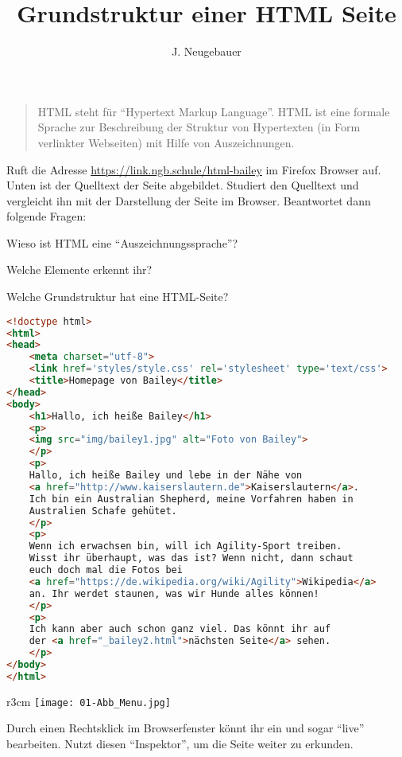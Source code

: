 \documentclass[a4paper,11pt,debug]{scrartcl}
\author{J. Neugebauer}
\title{Grundstruktur einer HTML Seite}
\date{\Heute}
\begin{document}
\ReiheTitel

\begin{quote}
HTML steht für \enquote{Hypertext Markup Language}. HTML ist eine formale Sprache zur Beschreibung der Struktur von Hypertexten (in Form verlinkter Webseiten) mit Hilfe von Auszeichnungen.
\end{quote}

\begin{aufgabe}
Ruft die Adresse \url{https://link.ngb.schule/html-bailey} im Firefox Browser auf. Unten ist der Quelltext der Seite abgebildet. Studiert den Quelltext und vergleicht ihn mit der Darstellung der Seite im Browser. Beantwortet dann folgende Fragen:
\begin{smallenumerate}
	\item  Wieso ist HTML eine \enquote{Auszeichnungssprache}?
	\item Welche Elemente erkennt ihr?
	\item Welche Grundstruktur hat eine HTML-Seite?
\end{smallenumerate}
\begin{lstlisting}[language=HTML,basicstyle=\scriptsize\ttfamily]
<!doctype html>
<html>
<head>
	<meta charset="utf-8">
	<link href='styles/style.css' rel='stylesheet' type='text/css'>
	<title>Homepage von Bailey</title>
</head>
<body>
	<h1>Hallo, ich heiße Bailey</h1>
	<p>
	<img src="img/bailey1.jpg" alt="Foto von Bailey">
	</p>
	<p>
	Hallo, ich heiße Bailey und lebe in der Nähe von 
	<a href="http://www.kaiserslautern.de">Kaiserslautern</a>. 
	Ich bin ein Australian Shepherd, meine Vorfahren haben in 
	Australien Schafe gehütet.
	</p>
	<p>
	Wenn ich erwachsen bin, will ich Agility-Sport treiben. 
	Wisst ihr überhaupt, was das ist? Wenn nicht, dann schaut 
	euch doch mal die Fotos bei 
	<a href="https://de.wikipedia.org/wiki/Agility">Wikipedia</a> 
	an. Ihr werdet staunen, was wir Hunde alles können!
	</p>
	<p>
	Ich kann aber auch schon ganz viel. Das könnt ihr auf 
	der <a href="_bailey2.html">nächsten Seite</a> sehen.
	</p>
</body>
</html>
\end{lstlisting}
\end{aufgabe}

\begin{aufgabe}
	\begin{wrapfigure}{r}{3cm}
		\texttt{[image: 01-Abb\_Menu.jpg]}
	\end{wrapfigure}
	Durch einen Rechtsklick im Browserfenster könnt ihr ein  und sogar \enquote{live} bearbeiten. Nutzt diesen \enquote{Inspektor}, um die Seite weiter zu erkunden.
\end{aufgabe}
\end{document}
